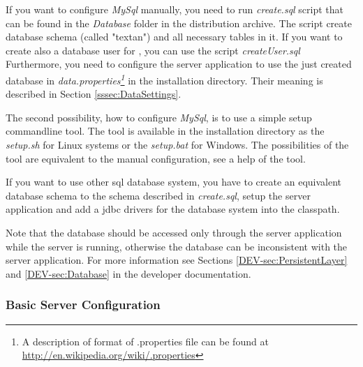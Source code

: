 If you want to configure \emph{MySql} manually, you need to run \emph{create.sql} script
that can be found in the \emph{Database} folder in the distribution archive. The script
create database schema (called "textan") and all necessary  tables in it. If you
want to create also a database user for \textan{}, you can use the script \emph{createUser.sql}
Furthermore, you need to configure the server application to use the just created
database in \emph{data.properties\footnote{A description of format of .properties file can
be found at \url{http://en.wikipedia.org/wiki/.properties}}} in the installation directory.
Their meaning is described in Section \ref{sssec:DataSettings}.

The second possibility, how to configure \emph{MySql}, is to use a simple setup
commandline tool. The tool is available in the installation directory as
the \emph{setup.sh} for Linux systems or the \emph{setup.bat} for Windows.
The possibilities of the tool are equivalent to the manual configuration, see
a help of the tool.

If you want to use other sql database system, you have to create an equivalent
database schema to the schema described in \emph{create.sql}, setup the server
application and add a jdbc drivers for the database system into the classpath.

Note that the database should be accessed only through the \textan{} server application
while the server is running, otherwise the database can be inconsistent with
the server application. For more information see Sections \ref{DEV-sec:PersistentLayer}
and \ref{DEV-sec:Database} in the developer documentation.

 

\subsubsection{Basic Server Configuration}

